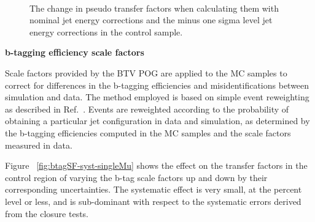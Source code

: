 \begin{figure}[]
  \centering
   ~~
  \caption{\label{fig:jes-syst-doubleMu} The change in pseudo transfer
  factors when calculating them with nominal jet energy corrections
  and the minus one sigma level jet energy corrections in the \mmj
  control sample.}
\end{figure}

{\bf b-tagging efficiency scale factors}

Scale factors provided by the BTV POG are applied to the MC samples
to correct for differences in the b-tagging efficiencies and 
misidentifications between simulation and data. The method employed is
based on simple event reweighting as described in
Ref.~\cite{btagSFMethods}. Events are reweighted according to the
probability of obtaining a particular jet configuration in data
and simulation, as determined by the b-tagging efficiencies computed
in the MC samples and the scale factors measured in data.

Figure ~\ref{fig:btagSF-syst-singleMu} shows the effect on the transfer
factors in the \mj control region of varying the b-tag scale factors 
up and down by their corresponding uncertainties. The systematic
effect is very small, at the percent level or less, and is
sub-dominant with respect to the systematic errors derived from the 
closure tests.


